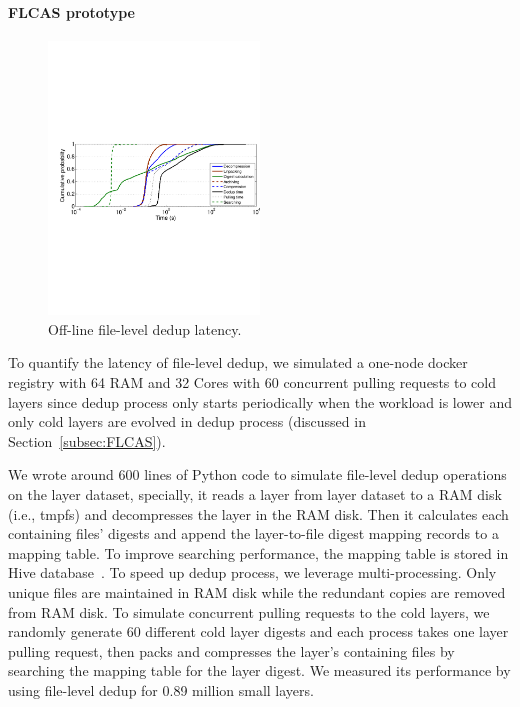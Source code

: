 \paragraph{FLCAS prototype}

\begin{figure}
	\centering
	\includegraphics[width=0.5\textwidth]{graphs/res-time.pdf}
	\caption{Off-line file-level dedup latency.
	}
	\label{fig:dedup-res}
\end{figure}

To quantify the latency of file-level dedup, we simulated a one-node docker registry with 64 RAM and 32 Cores with 60 concurrent pulling requests to cold layers since dedup process only starts periodically when the workload is lower and only cold layers are evolved in dedup process (discussed in Section~\ref{subsec:FLCAS}).

We wrote around 600 lines of Python code to simulate file-level dedup operations on the layer dataset, specially, it reads a layer from layer dataset to a RAM disk (i.e., tmpfs) and decompresses the layer in the RAM disk. Then it calculates each containing files' digests and append the layer-to-file digest mapping records to a mapping table. To improve searching performance, the mapping table is stored in Hive database~\cite{xxx}. To speed up dedup process, we leverage multi-processing. Only unique files are maintained in RAM disk while the redundant copies are removed from RAM disk. To simulate concurrent pulling requests to the cold layers, we randomly generate 60 different cold layer digests and each process takes one layer pulling request, then packs and compresses the layer's containing files by searching the mapping table for the layer digest. We measured its performance by using file-level dedup for 0.89 million small layers.

